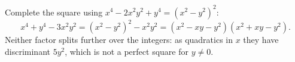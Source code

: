 Complete the square using $x^4-2x^2y^2+y^4=\left(x^2-y^2\right)^2$:
\[x^4+y^4-3x^2y^2=\left(x^2-y^2\right)^2-x^2y^2=\boxed{\left(x^2-xy-y^2\right)\left(x^2+xy-y^2\right)}.\]
Neither factor splits further over the integers: as quadratics in $x$ they have discriminant $5y^2$, which is not a perfect square for $y\ne0$.
